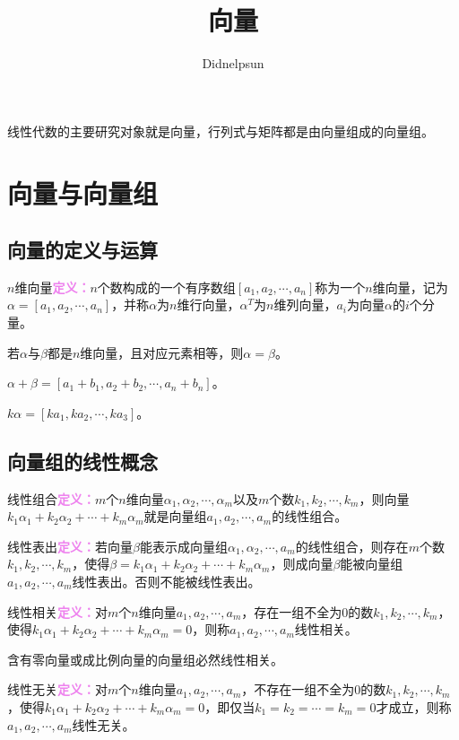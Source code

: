\documentclass[UTF8, 12pt]{ctexart}
\author{Didnelpsun}
\title{向量}
\date{}
\begin{document}
\maketitle
\pagestyle{empty}
\thispagestyle{empty}
\tableofcontents
\thispagestyle{empty}
\newpage
\pagestyle{plain}
\setcounter{page}{1}

线性代数的主要研究对象就是向量，行列式与矩阵都是由向量组成的向量组。

\section{向量与向量组}

\subsection{向量的定义与运算}

$n$维向量\textcolor{violet}{\textbf{定义：}}$n$个数构成的一个有序数组$[a_1,a_2,\cdots,a_n]$称为一个$n$维向量，记为$\alpha=[a_1,a_2,\cdots,a_n]$，并称$\alpha$为$n$维行向量，$\alpha^T$为$n$维列向量，$a_i$为向量$\alpha$的$i$个分量。

若$\alpha$与$\beta$都是$n$维向量，且对应元素相等，则$\alpha=\beta$。

$\alpha+\beta=[a_1+b_1,a_2+b_2,\cdots,a_n+b_n]$。

$k\alpha=[ka_1,ka_2,\cdots,ka_3]$。

\subsection{向量组的线性概念}

线性组合\textcolor{violet}{\textbf{定义：}}$m$个$n$维向量$\alpha_1,\alpha_2,\cdots,\alpha_m$以及$m$个数$k_1,k_2,\cdots,k_m$，则向量$k_1\alpha_1+k_2\alpha_2+\cdots+k_m\alpha_m$就是向量组$a_1,a_2,\cdots,a_m$的线性组合。

线性表出\textcolor{violet}{\textbf{定义：}}若向量$\beta$能表示成向量组$\alpha_1,\alpha_2,\cdots,a_m$的线性组合，则存在$m$个数$k_1,k_2,\cdots,k_m$，使得$\beta=k_1\alpha_1+k_2\alpha_2+\cdots+k_m\alpha_m$，则成向量$\beta$能被向量组$a_1,a_2,\cdots,a_m$线性表出。否则不能被线性表出。

线性相关\textcolor{violet}{\textbf{定义：}}对$m$个$n$维向量$a_1,a_2,\cdots,a_m$，存在一组不全为0的数$k_1,k_2,\cdots,k_m$，使得$k_1\alpha_1+k_2\alpha_2+\cdots+k_m\alpha_m=0$，则称$a_1,a_2,\cdots,a_m$线性相关。

含有零向量或成比例向量的向量组必然线性相关。

线性无关\textcolor{violet}{\textbf{定义：}}对$m$个$n$维向量$a_1,a_2,\cdots,a_m$，不存在一组不全为0的数$k_1,k_2,\cdots,k_m$，使得$k_1\alpha_1+k_2\alpha_2+\cdots+k_m\alpha_m=0$，即仅当$k_1=k_2=\cdots=k_m=0$才成立，则称$a_1,a_2,\cdots,a_m$线性无关。
\end{document}
